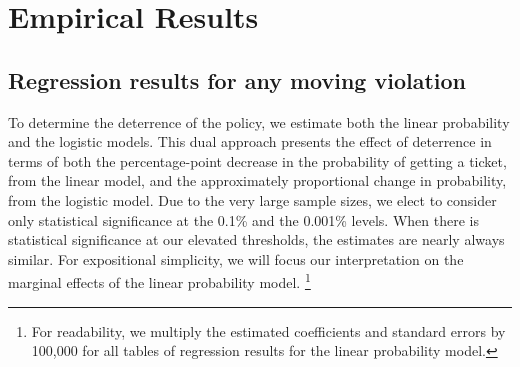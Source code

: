 \section{Empirical Results}
\label{sec:Empirical}


\subsection{Regression results for any moving violation}
\label{sec:Empirical_all}

To determine the deterrence of the policy, we estimate both the linear probability and the logistic models. 
% 
This dual approach presents the effect of deterrence in terms of 
both the percentage-point decrease in the probability of getting a ticket, 
from the linear model, 
and the approximately proportional change in probability, 
from the logistic model.  
%
Due to the very large sample sizes, 
we elect to consider only statistical significance at the 0.1\% and the 0.001\% levels. 
%
When there is statistical significance at our elevated thresholds, 
the estimates are nearly always similar. 
For expositional simplicity, we will focus our interpretation on 
the marginal effects of the linear probability model.%
\footnote{%
For readability, we multiply the estimated coefficients and standard errors by 100,000 
for all tables of regression results for the linear probability model.
% 
}




